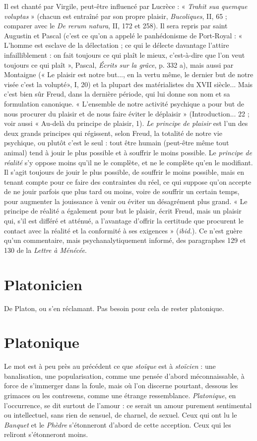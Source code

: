 Il est chanté par Virgile, peut-être influencé par Lucrèce : « {\it Trahit sua
quemque voluptas} » (chacun est entraîné par son propre plaisir, {\it Bucoliques}, II,
65 ; comparer avec le {\it De rerum natura}, II, 172 et 258). Il sera repris par saint
Augustin et Pascal (c’est ce qu’on a appelé le panhédonisme de Port-Royal :
« L'homme est esclave de la délectation ; ce qui le délecte davantage l’attire
infailliblement : on fait toujours ce qui plaît le mieux, c’est-à-dire que l’on
veut toujours ce qui plaît », Pascal, {\it Écrits sur la grâce}, p. 332 a), mais aussi par
Montaigne (« Le plaisir est notre but..., en la vertu même, le dernier but de
notre visée c’est la volupté», I, 20) et la plupart des matérialistes du
XVII siècle... Mais c’est bien sûr Freud, dans la dernière période, qui lui
donne son nom et sa formulation canonique. « L'ensemble de notre activité
psychique a pour but de nous procurer du plaisir et de nous faire éviter le
déplaisir » (Introduction... 22 ; voir aussi « Au-delà du principe de plaisir,
1). {\it Le principe de plaisir} est l’un des deux grands principes qui régissent, selon
Freud, la totalité de notre vie psychique, ou plutôt c’est le seul : tout être
humain (peut-être même tout animal) tend à jouir le plus possible et à souffrir
le moins possible. Le {\it principe de réalité} s'y oppose moins qu’il ne le complète,
et ne le complète qu’en le modifiant. Il s’agit toujours de jouir le plus
possible, de souffrir le moins possible, mais en tenant compte pour ce faire
des contraintes du réel, ce qui suppose qu’on accepte de ne jouir parfois que
plus tard ou moins, voire de souffrir un certain temps, pour augmenter la
jouissance à venir ou éviter un désagrément plus grand. « Le principe de réalité
a également pour but le plaisir, écrit Freud, mais un plaisir qui, s’il est
différé et atténué, a l'avantage d’offrir la certitude que procurent le contact
avec la réalité et la conformité à ses exigences » ({\it ibid.}). Ce n’est guère qu’un
commentaire, mais psychanalytiquement informé, des paragraphes 129
et 130 de la {\it Lettre à Ménécée}.

\section{Platonicien}
De Platon, ou s’en réclamant. Pas besoin pour cela de rester
platonique.

\section{Platonique}
Le mot est à peu près au précédent ce que {\it stoïque} est à
{\it stoïcien} : une banalisation, une popularisation, comme une
pensée d’abord méconnaissable, à force de s’immerger dans la foule, mais où
l’on discerne pourtant, dessous les grimaces ou les contresens, comme une
étrange ressemblance. {\it Platonique}, en l'occurrence, se dit surtout de l’amour : ce
serait un amour purement sentimental ou intellectuel, sans rien de sensuel, de
charnel, de sexuel. Ceux qui ont lu le {\it Banquet} et le {\it Phèdre} s'étonneront d’abord
de cette acception. Ceux qui les reliront s’étonneront moins.

